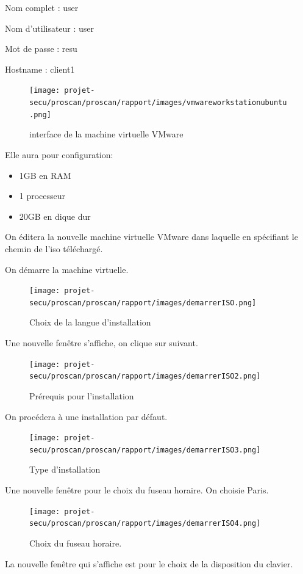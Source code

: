 \documentclass[11pt,a4paper,titlepage, oneside]{article}
\begin{document}
		Nom complet : user
			
		Nom d'utilisateur : user
		
		Mot de passe : resu
		
		Hostname : client1
		
		\begin{figure}[h]
  			\centering
  			\texttt{[image: projet-secu/proscan/proscan/rapport/images/vmwareworkstationubuntu.png]}
			\caption{interface de la machine virtuelle VMware}
		\end{figure}
		Elle aura pour configuration:
		\begin{itemize}
                        \item{1GB en RAM}
                        \item{1 processeur}
                        \item{20GB en dique dur}
                \end{itemize}
		On éditera la nouvelle machine virtuelle VMware dans laquelle en spécifiant le chemin de l'iso téléchargé.
		
		On démarre la machine virtuelle.
	\newpage
		\begin{figure}[h]
                        \centering
                        \texttt{[image: projet-secu/proscan/proscan/rapport/images/demarrerISO.png]}
                        \caption{Choix de la langue d'installation}
                \end{figure}
		Une nouvelle fenêtre s'affiche, on clique sur suivant.
		 \begin{figure}[h]
                        \centering
                        \texttt{[image: projet-secu/proscan/proscan/rapport/images/demarrerISO2.png]}
                        \caption{Prérequis pour l'installation}
                \end{figure}
	\newpage
		On procédera à une installation par défaut.
		 \begin{figure}[h]
                        \centering
                        \texttt{[image: projet-secu/proscan/proscan/rapport/images/demarrerISO3.png]}
                        \caption{Type d'installation}
                \end{figure}
		
	\newpage
		Une nouvelle fenêtre pour le choix du fuseau horaire. On choisie Paris.
		 \begin{figure}[h]
                        \centering
                        \texttt{[image: projet-secu/proscan/proscan/rapport/images/demarrerISO4.png]}
                        \caption{Choix du fuseau horaire.}
                \end{figure}
	\newpage
		La nouvelle fenêtre qui s'affiche est pour le choix de la disposition du clavier.
\end{document}

